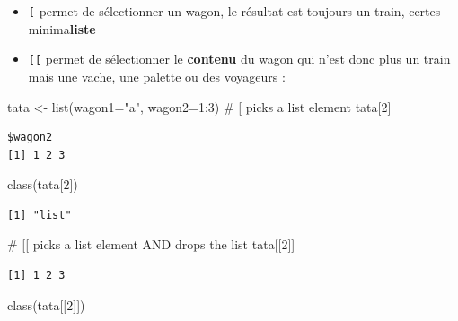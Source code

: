 \documentclass[
  letterpaper,
  DIV=11,
  numbers=noendperiod]{scrreprt}
\newenvironment{Shaded}{\begin{snugshade}}{\end{snugshade}}
\newcommand{\AttributeTok}[1]{\textcolor[rgb]{0.40,0.45,0.13}{#1}}
\newcommand{\CommentTok}[1]{\textcolor[rgb]{0.37,0.37,0.37}{#1}}
\newcommand{\DecValTok}[1]{\textcolor[rgb]{0.68,0.00,0.00}{#1}}
\newcommand{\FunctionTok}[1]{\textcolor[rgb]{0.28,0.35,0.67}{#1}}
\newcommand{\NormalTok}[1]{\textcolor[rgb]{0.00,0.23,0.31}{#1}}
\newcommand{\OtherTok}[1]{\textcolor[rgb]{0.00,0.23,0.31}{#1}}
\newcommand{\SpecialCharTok}[1]{\textcolor[rgb]{0.37,0.37,0.37}{#1}}
\newcommand{\StringTok}[1]{\textcolor[rgb]{0.13,0.47,0.30}{#1}}
\providecommand{\tightlist}{%
  \setlength{\itemsep}{0pt}\setlength{\parskip}{0pt}}\usepackage{longtable,booktabs,array}
\begin{document}
\begin{itemize}
\tightlist
\item
  \texttt{{[}} permet de sélectionner un wagon, le résultat est toujours
  un train, certes minima\textbf{liste}
\item
  \texttt{{[}{[}} permet de sélectionner le \textbf{contenu} du wagon
  qui n'est donc plus un train mais une vache, une palette ou des
  voyageurs :
\end{itemize}

\begin{Shaded}
\begin{Highlighting}[]
\NormalTok{tata }\OtherTok{\textless{}{-}} \FunctionTok{list}\NormalTok{(}\AttributeTok{wagon1=}\StringTok{"a"}\NormalTok{, }\AttributeTok{wagon2=}\DecValTok{1}\SpecialCharTok{:}\DecValTok{3}\NormalTok{)}
\CommentTok{\# [ picks a list element}
\NormalTok{tata[}\DecValTok{2}\NormalTok{]}
\end{Highlighting}
\end{Shaded}

\begin{verbatim}
$wagon2
[1] 1 2 3
\end{verbatim}

\begin{Shaded}
\begin{Highlighting}[]
\FunctionTok{class}\NormalTok{(tata[}\DecValTok{2}\NormalTok{])}
\end{Highlighting}
\end{Shaded}

\begin{verbatim}
[1] "list"
\end{verbatim}

\begin{Shaded}
\begin{Highlighting}[]
\CommentTok{\# [[ picks a list element AND drops the list}
\NormalTok{tata[[}\DecValTok{2}\NormalTok{]]}
\end{Highlighting}
\end{Shaded}

\begin{verbatim}
[1] 1 2 3
\end{verbatim}

\begin{Shaded}
\begin{Highlighting}[]
\FunctionTok{class}\NormalTok{(tata[[}\DecValTok{2}\NormalTok{]])}
\end{Highlighting}
\end{Shaded}
\end{document}
